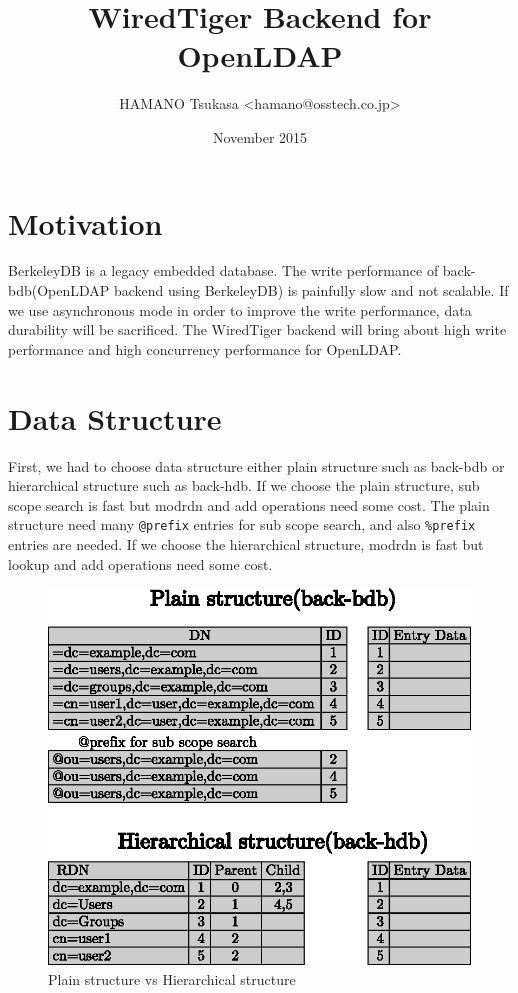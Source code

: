 \documentclass[a4paper,twocolumn,11pt]{article}
\title{WiredTiger Backend for OpenLDAP}
\author{HAMANO Tsukasa \textless{}hamano@osstech.co.jp\textgreater{}}
\date{November 2015}
\begin{document}
\maketitle

\section{Motivation}\label{motivation}

BerkeleyDB is a legacy embedded database. The write performance of
back-bdb(OpenLDAP backend using BerkeleyDB) is painfully slow and not
scalable. If we use asynchronous mode in order to improve the write
performance, data durability will be sacrificed. The WiredTiger backend
will bring about high write performance and high concurrency performance
for OpenLDAP.

\section{Data Structure}\label{data-structure}

First, we had to choose data structure either plain structure such as
back-bdb or hierarchical structure such as back-hdb. If we choose the
plain structure, sub scope search is fast but modrdn and add operations
need some cost. The plain structure need many \texttt{@prefix} entries
for sub scope search, and also \texttt{\%prefix} entries are needed. If
we choose the hierarchical structure, modrdn is fast but lookup and add
operations need some cost.

\begin{figure}[H]
\centering
\includegraphics[width=0.9\columnwidth]{figure/plain_vs_hierarchical.eps}
\caption{Plain structure vs Hierarchical structure}
\end{figure}
\end{document}
